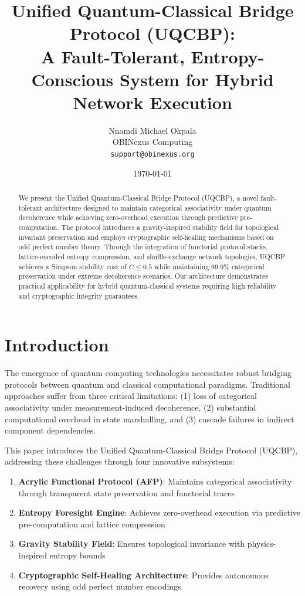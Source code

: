 \documentclass[11pt,a4paper]{article}
\title{Unified Quantum-Classical Bridge Protocol (UQCBP):\\
A Fault-Tolerant, Entropy-Conscious System for Hybrid Network Execution}
\author{Nnamdi Michael Okpala\\
OBINexus Computing\\
\texttt{support@obinexus.org}}
\date{\today}
\begin{document}
\maketitle

\begin{abstract}
We present the Unified Quantum-Classical Bridge Protocol (UQCBP), a novel fault-tolerant architecture designed to maintain categorical associativity under quantum decoherence while achieving zero-overhead execution through predictive pre-computation. The protocol introduces a gravity-inspired stability field for topological invariant preservation and employs cryptographic self-healing mechanisms based on odd perfect number theory. Through the integration of functorial protocol stacks, lattice-encoded entropy compression, and shuffle-exchange network topologies, UQCBP achieves a Simpson stability cost of $C \leq 0.5$ while maintaining 99.9\% categorical preservation under extreme decoherence scenarios. Our architecture demonstrates practical applicability for hybrid quantum-classical systems requiring high reliability and cryptographic integrity guarantees.
\end{abstract}

\section{Introduction}

The emergence of quantum computing technologies necessitates robust bridging protocols between quantum and classical computational paradigms. Traditional approaches suffer from three critical limitations: (1) loss of categorical associativity under measurement-induced decoherence, (2) substantial computational overhead in state marshalling, and (3) cascade failures in indirect component dependencies.

This paper introduces the Unified Quantum-Classical Bridge Protocol (UQCBP), addressing these challenges through four innovative subsystems:

\begin{enumerate}
    \item \textbf{Acrylic Functional Protocol (AFP)}: Maintains categorical associativity through transparent state preservation and functorial traces
    \item \textbf{Entropy Foresight Engine}: Achieves zero-overhead execution via predictive pre-computation and lattice compression
    \item \textbf{Gravity Stability Field}: Ensures topological invariance with physics-inspired entropy bounds
    \item \textbf{Cryptographic Self-Healing Architecture}: Provides autonomous recovery using odd perfect number encodings
\end{enumerate}
\end{document}
